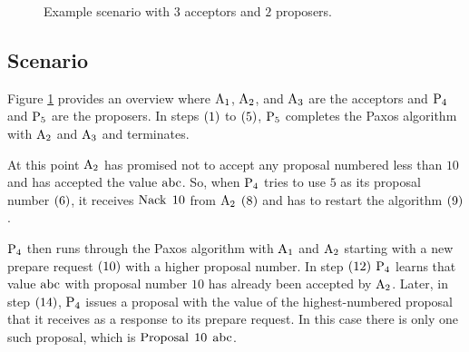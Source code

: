 \begin{figure}
\begin{center}
\end{center}
\caption{Example scenario with $3$ acceptors and $2$ proposers.}
\label{fig:scenario}
\end{figure}

\subsection{Scenario}
Figure \ref{fig:scenario} provides an overview where $\operatorname{A_{1}}$, $\operatorname{A_{2}}$, and $\operatorname{A_{3}}$ are the acceptors and $\operatorname{P_{4}}$ and $\operatorname{P_{5}}$ are the proposers.
In steps $\left(1\right)$ to $\left(5\right)$, $\operatorname{P_{5}}$ completes the Paxos algorithm with $\operatorname{A_{2}}$ and $\operatorname{A_{3}}$ and terminates.

At this point $\operatorname{A_{2}}$ has promised not to accept any proposal numbered less than $10$ and has accepted the value $\operatorname{abc}$.
So, when $\operatorname{P_{4}}$ tries to use $5$ as its proposal number $\left(6\right)$, it receives $\operatorname{Nack}\; 10$ from $\operatorname{A_{2}}$ $\left(8\right)$ and has to restart the algorithm $\left(9\right)$.

$\operatorname{P_{4}}$ then runs through the Paxos algorithm with $\operatorname{A_{1}}$ and $\operatorname{A_{2}}$ starting with a new prepare request $\left(10\right)$ with a higher proposal number.
In step $\left(12\right)$ $\operatorname{P_{4}}$ learns that value $\operatorname{abc}$ with proposal number $10$ has already been accepted by $\operatorname{A_{2}}$.
Later, in step $\left(14\right)$, $\operatorname{P_{4}}$ issues a proposal with the value of the highest-numbered proposal that it receives as a response to its prepare request.
In this case there is only one such proposal, which is $\operatorname{Proposal}\; 10\; \operatorname{abc}$.

